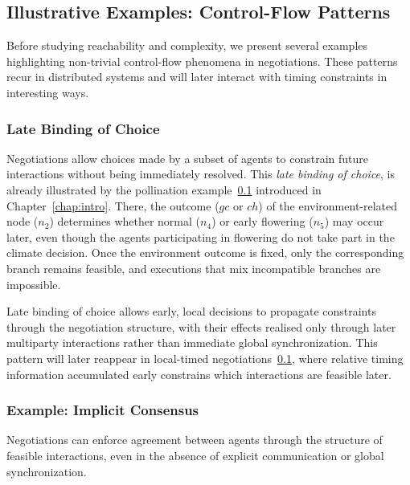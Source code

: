 
\subsection{Illustrative Examples: Control-Flow Patterns}

Before studying reachability and complexity, we present several examples highlighting non-trivial control-flow phenomena in negotiations. These patterns recur in distributed systems and will later interact with timing constraints in interesting ways.


\subsubsection{Late Binding of Choice}
\label{subsec:neg-late-binding}

Negotiations allow choices made by a subset of agents to constrain future
interactions without being immediately resolved. This
\emph{late binding of choice}, is already illustrated by the pollination example~\ref{}
introduced in Chapter~\ref{chap:intro}. There, the outcome ($gc$ or $ch$) of the environment-related
node ($n_2$) determines whether normal ($n_4$) or early flowering ($n_5$) may occur later, even though
the agents participating in flowering do not take part in the climate decision.
Once the environment outcome is fixed, only the corresponding branch remains
feasible, and executions that mix incompatible branches are impossible.

Late binding of choice allows early, local decisions to propagate constraints
through the negotiation structure, with their effects realised only through
later multiparty interactions rather than immediate global synchronization.
This pattern will later reappear in local-timed negotiations~\ref{}, where relative timing
information accumulated early constrains which interactions are feasible later.
\subsubsection{Example: Implicit Consensus}
\label{subsec:neg-implicit-consensus}

Negotiations can enforce agreement between agents through the structure of feasible
interactions, even in the absence of explicit communication or global
synchronization.

